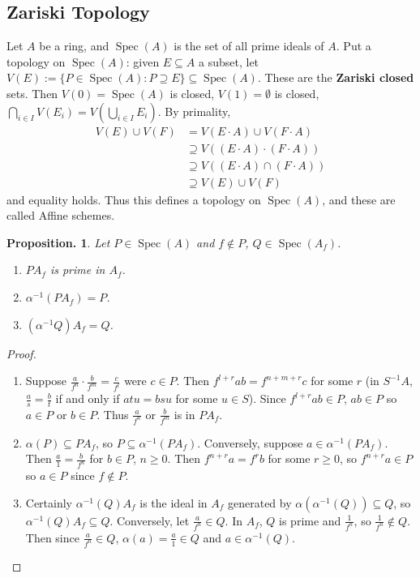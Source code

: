 \documentclass[11pt, a4paper]{memoir}
\theoremstyle{change}
\newtheorem{proposition}[theorem]{Proposition.}
\theoremstyle{plain}
\theoremstyle{nonumberplain}
\newtheorem{proof}{Proof}
\DeclareMathOperator{\Spec}{Spec}
\numberwithin{equation}{section}
\begin{document}
\subsection{Zariski Topology}
Let $A$ be a ring, and $\Spec(A)$ is the set of all prime ideals of $A$.
Put a topology on $\Spec(A)$: given $E\subseteq A$ a subset, let $V(E):=\{P\in\Spec(A):P\supseteq E\}\subseteq\Spec(A)$.
These are the \textbf{Zariski closed} sets.
Then $V(0)=\Spec(A)$ is closed, $V(1)=\emptyset$ is closed, $\bigcap_{i\in I}V(E_i)=V(\bigcup_{i\in I}E_i)$.
By primality,
\begin{align*}
    V(E)\cup V(F) &= V(E\cdot A)\cup V(F\cdot A)\\
                  &\supseteq V((E\cdot A)\cdot(F\cdot A))\\
                  &\supseteq V((E\cdot A)\cap(F\cdot A))\\
                  &\supseteq V(E)\cup V(F)
\end{align*}
and equality holds.
Thus this defines a topology on $\Spec(A)$, and these are called Affine schemes.
\begin{proposition}
    Let $P\in\Spec(A)$ and $f\notin P$, $Q\in\Spec(A_f)$.
    \begin{enumerate}[nolistsep]
        \item $PA_f$ is prime in $A_f$.
        \item $\alpha^{-1}(PA_f)=P$.
        \item $(\alpha^{-1}Q)A_f=Q$.
    \end{enumerate}
\end{proposition}
\begin{proof}
    \begin{enumerate}
        \item 
            Suppose $\frac{a}{f^n}\cdot\frac{b}{f^m}=\frac{c}{f^l}$ were $c\in P$.
            Then $f^{l+r}ab=f^{n+m+r}c$ for some $r$ (in $S^{-1}A$, $\frac{a}{s}=\frac{b}{t}$ if and only if $atu=bsu$ for some $u\in S$).
            Since $f^{l+r}ab\in P$, $ab\in P$ so $a\in P$ or $b\in P$.
            Thus $\frac{a}{f^n}$ or $\frac{b}{f^m}$ is in $PA_f$.
        \item 
            $\alpha(P)\subseteq PA_f$, so $P\subseteq\alpha^{-1}(PA_f)$.
            Conversely, suppose $a\in\alpha^{-1}(PA_f)$.
            Then $\frac{a}{1}=\frac{b}{f^n}$ for $b\in P$, $n\geq 0$.
            Then $f^{n+r}a=f^rb$ for some $r\geq 0$, so $f^{n+r}a\in P$ so $a\in P$ since $f\notin P$.
        \item Certainly $\alpha^{-1}(Q)A_f$ is the ideal in $A_f$ generated by $\alpha(\alpha^{-1}(Q))\subseteq Q$, so $\alpha^{-1}(Q)A_f\subseteq Q$.
            Conversely, let $\frac{a}{f^n}\in Q$.
            In $A_f$, $Q$ is prime and $\frac{1}{f^n}$, so $\frac{1}{f^n}\notin Q$.
            Then since $\frac{a}{f^n}\in Q$, $\alpha(a)=\frac{a}{1}\in Q$ and $a\in\alpha^{-1}(Q)$.
    \end{enumerate}
\end{proof}
\end{document}
